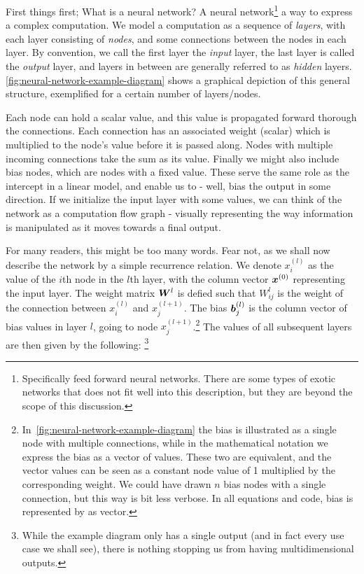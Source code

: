 \documentclass[Thesis.tex]{subfiles}
\begin{document}
First things first; What is a neural network? A neural
network\footnote{Specifically feed forward neural networks. There are some types
of exotic networks that does not fit well into this description, but they are
beyond the scope of this discussion.} a way to express a complex computation. We
model a computation as a sequence of
\emph{layers}, with each layer consisting of \emph{nodes}, and some connections
between the nodes in each layer. By convention, we call the first layer the
\emph{input} layer, the last layer is called the \emph{output} layer, and layers
in between are generally referred to as \emph{hidden} layers.
\cref{fig:neural-network-example-diagram} shows a graphical depiction of this
general structure, exemplified for a certain number of layers/nodes.

Each node can hold a scalar value, and this value is propagated forward thorough
the connections. Each connection has an associated weight (scalar) which is
multiplied to the node's value before it is passed along. Nodes with multiple
incoming connections take the sum as its value. Finally we might also include
bias nodes, which are nodes with a fixed value. These serve the same role as the
intercept in a linear model, and enable us to - well, bias the output in some
direction. If we initialize the input layer with some values, we can think of
the network as a computation flow graph - visually representing the way
information is manipulated as it moves towards a final output.

For many readers, this might be too many words. Fear not, as we shall now
describe the network by a simple recurrence relation. We denote $x_i^{(l)}$ as
the value of the $i$th node in the $l$th layer, with the column vector
$\bm{x}^{(0)}$ representing the input layer. The weight matrix $\bm{W}^{l}$ is
defied such that $W^{l}_{ij}$ is the weight of the connection between
$x_i^{(l)}$ and $x_j^{(l+1)}$. The bias $\bm{b}_j^{(l)}$ is the column vector of
bias values in layer $l$, going to node
$x_j^{(l+1)}$.\footnote{In~\cref{fig:neural-network-example-diagram} the bias is
illustrated as a single node with multiple connections, while in the
mathematical notation we express the bias as a vector of values. These two are
equivalent, and the vector values can be seen as a constant node value of 1
multiplied by the corresponding weight. We could have drawn $n$ bias nodes with
a single connection, but this way is bit less verbose. In all equations and
code, bias is represented by as vector.} The values of all subsequent layers are
then given by the following: \footnote{While the example diagram only has a
single output (and in fact every use case we shall see), there is nothing
stopping us from having multidimensional outputs.}
\end{document}
